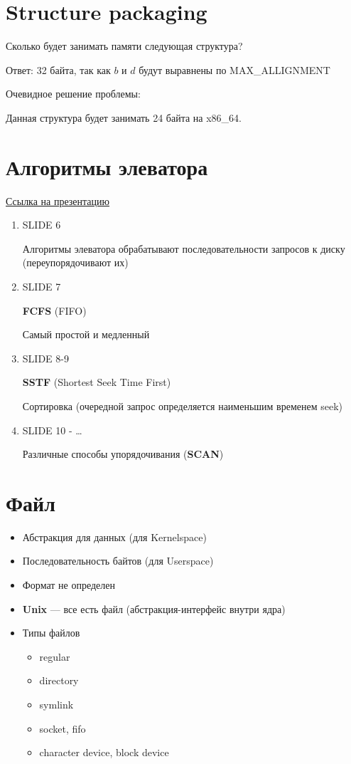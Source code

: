\documentclass[../../lectures.tex]{subfiles}
\begin{document}
\section{Structure packaging}
Сколько будет занимать памяти следующая структура?


Ответ: 32 байта, так как $b$ и $d$ будут выравнены по MAX\_ALLIGNMENT

Очевидное решение проблемы:


Данная структура будет занимать 24 байта на x86\_64.

\section{Алгоритмы элеватора}
\textcolor{blue}{\href{https://slideplayer.com/slide/5209336}{Ссылка на презентацию}}
\begin{enumerate}
    \item SLIDE 6

          Алгоритмы элеватора обрабатывают последовательности запросов к диску (переупорядочивают их)
    \item SLIDE 7

          \textbf{FCFS} (FIFO)

          Самый простой и медленный
    \item SLIDE 8-9

          \textbf{SSTF} (Shortest Seek Time First)

          Сортировка (очередной запрос определяется наименьшим временем seek)
    \item SLIDE 10 - \dots

          Различные способы упорядочивания (\textbf{SCAN})
\end{enumerate}

\section{Файл}
\begin{itemize}
    \item Абстракция для данных (для Kernelspace)
    \item Последовательность байтов (для Userspace)
    \item Формат не определен
    \item \textbf{Unix} --- все есть файл (абстракция-интерфейс внутри ядра)
    \item Типы файлов 
          \begin{itemize}
            \item regular
            \item directory
            \item symlink
            \item socket, fifo
            \item character device, block device
          \end{itemize}
\end{itemize}
\end{document}
